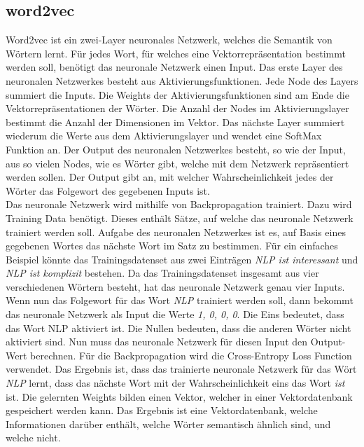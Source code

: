 \subsection{word2vec}
Word2vec ist ein zwei-Layer neuronales Netzwerk, welches die Semantik von Wörtern lernt.
Für jedes Wort, für welches eine Vektorrepräsentation bestimmt werden soll, benötigt das neuronale Netzwerk einen Input.
Das erste Layer des neuronalen Netzwerkes besteht aus Aktivierungsfunktionen.
Jede Node des Layers summiert die Inputs.
Die Weights der Aktivierungsfunktionen sind am Ende die Vektorrepräsentationen der Wörter.
Die Anzahl der Nodes im Aktivierungslayer bestimmt die Anzahl der Dimensionen im Vektor.
Das nächste Layer summiert wiederum die Werte aus dem Aktivierungslayer und wendet eine SoftMax Funktion an.
Der Output des neuronalen Netzwerkes besteht, so wie der Input, aus so vielen Nodes, wie es Wörter gibt, welche mit dem Netzwerk repräsentiert werden sollen.
Der Output gibt an, mit welcher Wahrscheinlichkeit jedes der Wörter das Folgewort des gegebenen Inputs ist.\\ 

Das neuronale Netzwerk wird mithilfe von Backpropagation trainiert.
Dazu wird Training Data benötigt.
Dieses enthält Sätze, auf welche das neuronale Netzwerk trainiert werden soll.
Aufgabe des neuronalen Netzwerkes ist es, auf Basis eines gegebenen Wortes das nächste Wort im Satz zu bestimmen.
Für ein einfaches Beispiel könnte das Trainingsdatenset aus zwei Einträgen \textit{NLP ist interessant} und \textit{NLP ist komplizit} bestehen.
Da das Trainingsdatenset insgesamt aus vier verschiedenen Wörtern besteht, hat das neuronale Netzwerk genau vier Inputs.
Wenn nun das Folgewort für das Wort \textit{NLP} trainiert werden soll, dann bekommt das neuronale Netzwerk als Input die Werte \textit{1, 0, 0, 0}.
Die Eins bedeutet, dass das Wort NLP aktiviert ist.
Die Nullen bedeuten, dass die anderen Wörter nicht aktiviert sind.
Nun muss das neuronale Netzwerk für diesen Input den Output-Wert berechnen.
Für die Backpropagation wird die Cross-Entropy Loss Function verwendet.
Das Ergebnis ist, dass das trainierte neuronale Netzwerk für das Wört \textit{NLP} lernt, dass das nächste Wort mit der Wahrscheinlichkeit eins das Wort \textit{ist} ist.
Die gelernten Weights bilden einen Vektor, welcher in einer Vektordatenbank gespeichert werden kann.
Das Ergebnis ist eine Vektordatenbank, welche Informationen darüber enthält, welche Wörter semantisch ähnlich sind, und welche nicht.

